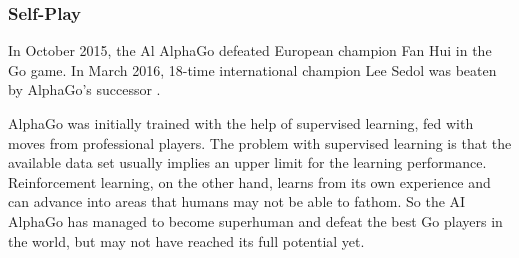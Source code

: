 \subsubsection{Self-Play}
\begin{comment}

- Dota 2 openai
    - https://openai.com/five/
    - https://openai.com/blog/openai-baselines-ppo/
    
- phan paper training 1 - agents develop motor skills
- \cite{selfplay-heinrich}  many real-world applications are in principle games

- schach?
- go?
- dota?
- physical openai

"if you arent really good - your opponent isnt either. if you are getting better - your opponent gets better" - perfect curriculum

"agent that you train in self play is useful for external task"

https://www.youtube.com/watch?v=BJi6N4tDupk

supervised learning - limited by dataset - creates ceiling of how far it can go
\end{comment}


In October 2015, the Al AlphaGo defeated European champion Fan Hui in the Go game. In March 2016, 18-time international champion Lee Sedol was beaten by AlphaGo's successor \cite{GoalphaGosilver2017mastering}. 
\begin{comment}
AlphaGo was initially trained with the help of supervised learning, fed with moves from professional players. Afterwards policy-gradient reinforcement learning was applied and the value network was taught to determine the winner of games of the policy network against itself. These networks were then combined with Monte-Carlo Tree Search to select the best possible action from the current state \cite{alphaGosilver2017mastering}.
\end{comment}
AlphaGo was initially trained with the help of supervised learning, fed with moves from professional players.
The problem with supervised learning is that the available data set usually implies an upper limit for the learning performance. Reinforcement learning, on the other hand, learns from its own experience and can advance into areas that humans may not be able to fathom. So the AI AlphaGo has managed to become superhuman and defeat the best Go players in the world, but may not have reached its full potential yet.

